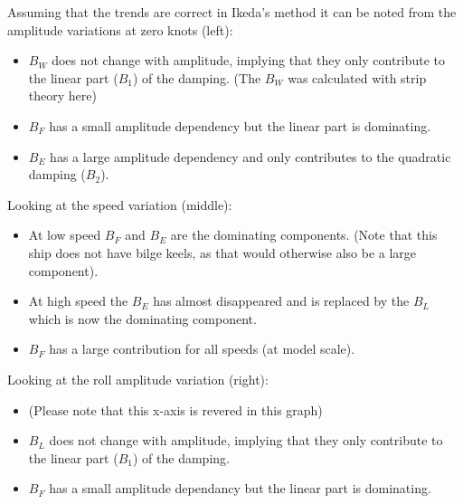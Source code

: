 Assuming that the trends are correct in Ikeda's method it can be noted from the amplitude variations at zero knots (left):
\begin{itemize}
\item $B_W$ does not change with amplitude, implying that they only contribute to the linear part ($B_1$) of the damping. (The $B_W$ was calculated with strip theory here)
\item $B_F$ has a small amplitude dependency but the linear part is dominating.
\item $B_E$ has a large amplitude dependency and only contributes to the quadratic damping ($B_2$)\cite{7505983/4AFVVGNT}.
\end{itemize}

Looking at the speed variation (middle):

\begin{itemize}
\item At low speed $B_F$ and $B_E$ are the dominating components. (Note that this ship does not have bilge keels, as that would otherwise also be a large component).
\item At high speed the $B_E$ has almost disappeared and is replaced by the $B_L$ which is now the dominating component.
\item $B_F$ has a large contribution for all speeds (at model scale).
\end{itemize}

Looking at the roll amplitude variation (right):

\begin{itemize}
\item (Please note that this x-axis is revered in this graph)
\item $B_L$ does not change with amplitude, implying that they only contribute to the linear part ($B_1$) of the damping.
\item $B_F$ has a small amplitude dependancy but the linear part is dominating.
\end{itemize}

    
